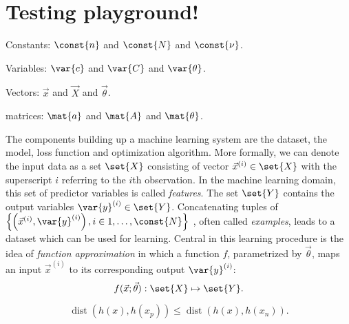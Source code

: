\documentclass[\home/main.tex]{subfiles}
\begin{document}
\chapter{Testing playground!} \label{ch:fsds}

Constants: $\const{n}$ and $\const{N}$ and $\const{\nu}$.

Variables: $\var{c}$ and $\var{C}$ and $\var{\theta}$.

Vectors: $\vec{x}$ and $\vec{X}$ and $\vec{\theta}$.

matrices: $\mat{a}$ and $\mat{A}$ and $\mat{\theta}$.

The components building up a machine learning system are the dataset, the model, loss function and optimization algorithm.
More formally, we can denote the input data as a set $\set{X}$ consisting of vector $\vec{x}^{(i)} \in \set{X} $ with the superscript $i$ referring to the $i$th observation. In the machine learning domain, this set of predictor variables is called \textit{features}. The set $\set{Y}$ contains the output variables $\var{y}^{(i)} \in \set{Y}$. Concatenating tuples of
$\left\{\left(\vec{x}^{(i)}, \var{y}^{(i)}\right) , i \in 1,\dots,\const{N} \right\}$
, often called \textit{examples}, leads to a dataset which can be used for learning. Central in this learning procedure is the idea of \textit{function approximation} in which a function $f$, parametrized by $\vec{\theta}$, maps an input $\vec{x}^{(i)}$ to its corresponding output $\var{y}^{(i)}$:
\begin{equation*}
	f(\vec{x};\vec{\theta}): \set{X} \mapsto \set{Y}\text{.}
\end{equation*}



\begin{equation*}
	\operatorname{dist}{\left( h(x),h(x_p) \right)} \leq \operatorname{dist}{\left( h(x),h(x_n) \right)} .
\end{equation*}
\end{document}
